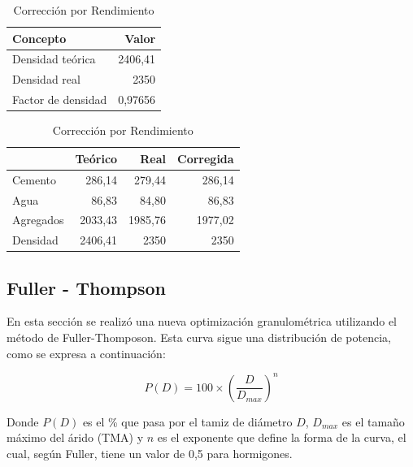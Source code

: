 \begin{table}[H]
\centering
\caption{Rendimiento de mezcla y factor de densidad}
\label{tab:rend-y-factor}
\small
\setlength{\tabcolsep}{6pt}
\renewcommand{\arraystretch}{1.15}

\begin{subtable}[t]{0.38\textwidth}
\centering
\caption{Densidades}
\label{tab:factor-rendimiento}
\begin{tabular}{lr}
\toprule
\textbf{Concepto} & \textbf{Valor} \\
\midrule
Densidad teórica & 2406,41 \\
Densidad real    & 2350 \\
Factor de densidad          & 0,97656 \\
\bottomrule
\end{tabular}
\end{subtable}
\begin{subtable}[t]{0.58\textwidth}
\centering
\caption{Corrección por Rendimiento}
\label{tab:rendimiento}
\begin{tabular}{lrrr}
\toprule
 & \textbf{Teórico} & \textbf{Real} & \textbf{Corregida} \\
\midrule
Cemento   & 286,14 & 279,44 & 286,14 \\
Agua      & 86,83 & 84,80 & 86,83 \\
Agregados & 2033,43 & 1985,76 & 1977,02 \\
Densidad  & 2406,41 & 2350 & 2350 \\
\bottomrule
\end{tabular}
\end{subtable}

\end{table}


\subsection{Fuller - Thompson}

En esta sección se realizó una nueva optimización granulométrica utilizando el método de Fuller-Thomposon. Esta curva sigue una distribución de potencia, como se expresa a continuación:

\begin{equation}
    P(D) = 100 \times (\frac{D}{D_{max}})^n
\end{equation}

Donde $P(D)$ es el \% que pasa por el tamiz de diámetro $D$, $D_{max}$ es el tamaño máximo del árido (TMA) y $n$ es el exponente que define la forma de la curva, el cual, según Fuller, tiene un valor de 0,5 para hormigones.


